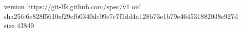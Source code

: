 version https://git-lfs.github.com/spec/v1
oid sha256:6e828f5610ef29efb0340dc09e7c7f1dd4a128b73e1b79e464531882038e927d
size 43840
